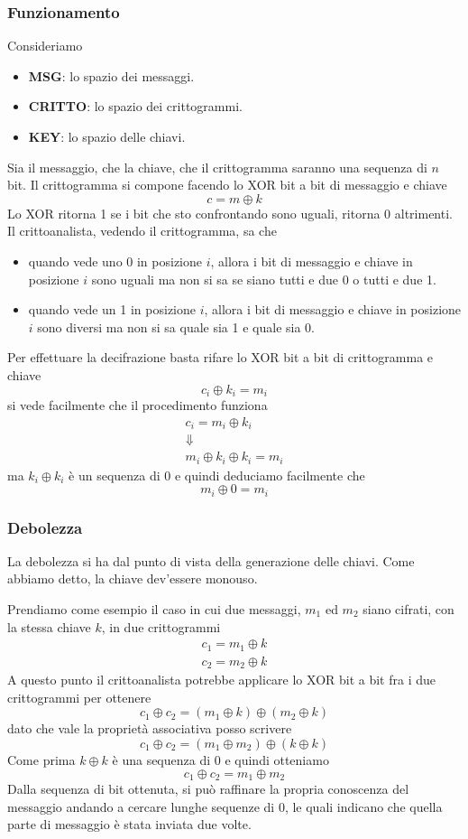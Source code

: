 \subsubsection{Funzionamento}
Consideriamo
\begin{itemize}
	\item \textbf{MSG}: lo spazio dei messaggi.
	\item \textbf{CRITTO}: lo spazio dei crittogrammi.
	\item \textbf{KEY}: lo spazio delle chiavi.
\end{itemize}
Sia il messaggio, che la chiave, che il crittogramma saranno una sequenza di $n$ bit. Il crittogramma si compone facendo
lo XOR bit a bit di messaggio e chiave
\[ c = m \oplus k \]
Lo XOR ritorna 1 se i bit che sto confrontando sono uguali, ritorna 0 altrimenti. Il crittoanalista, vedendo il
crittogramma, sa che
\begin{itemize}
	\item quando vede uno 0 in posizione $i$, allora i bit di messaggio e chiave in posizione $i$ sono uguali ma
	      non si sa se siano tutti e due 0 o tutti e due 1.
	\item quando vede un 1 in posizione $i$, allora i bit di messaggio e chiave in posizione $i$ sono diversi ma
	      non si sa quale sia 1 e quale sia 0.
\end{itemize}
Per effettuare la decifrazione basta rifare lo XOR bit a bit di crittogramma e chiave
\[ c_i \oplus k_i = m_i \]
si vede facilmente che il procedimento funziona
\begin{gather*}
	c_i = m_i \oplus k_i \\
	\Downarrow \\
	m_i \oplus k_i \oplus k_i = m_i
\end{gather*}
ma $k_i \oplus k_i$ \`e un sequenza di 0 e quindi deduciamo facilmente che
\[ m_i \oplus 0 = m_i \]

\subsubsection{Debolezza}
La debolezza si ha dal punto di vista della generazione delle chiavi. Come abbiamo detto, la chiave dev'essere monouso.

Prendiamo come esempio il caso in cui due messaggi, $m_1$ ed $m_2$ siano cifrati, con la stessa chiave $k$, in due
crittogrammi
\begin{gather*}
	c_1 = m_1 \oplus k \\
	c_2 = m_2 \oplus k
\end{gather*}
A questo punto il crittoanalista potrebbe applicare lo XOR bit a bit fra i due crittogrammi per ottenere
\[ c_1 \oplus c_2 = (m_1 \oplus k) \oplus (m_2 \oplus k) \]
dato che vale la propriet\`a associativa posso scrivere
\[ c_1 \oplus c_2 = (m_1 \oplus m_2) \oplus (k \oplus k) \]
Come prima $k \oplus k$ \`e una sequenza di 0 e quindi otteniamo
\[ c_1 \oplus c_2 = m_1 \oplus m_2 \]
Dalla sequenza di bit ottenuta, si pu\`o raffinare la propria conoscenza del messaggio andando a cercare lunghe sequenze
di 0, le quali indicano che quella parte di messaggio \`e stata inviata due volte.


